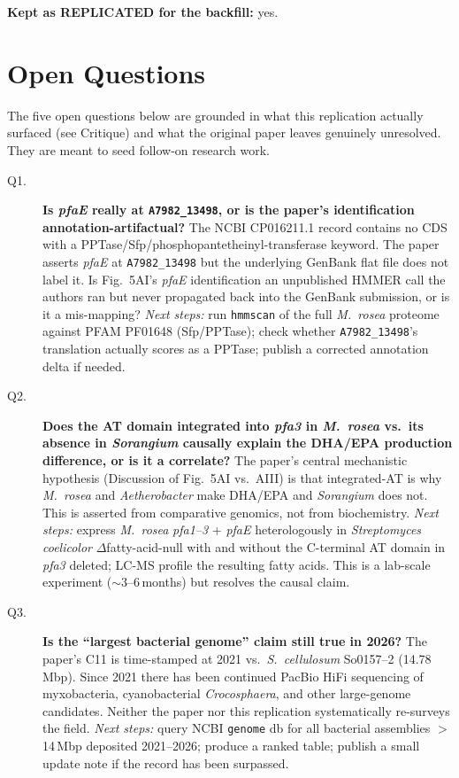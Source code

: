 \documentclass[11pt,letterpaper]{article}
\begin{document}
\textbf{Kept as REPLICATED for the backfill:} yes.

\section{Open Questions}\label{sec:oq}

The five open questions below are grounded in what this replication actually surfaced (see Critique) and what the original paper leaves genuinely unresolved. They are meant to seed follow-on research work.

\begin{description}
\item[Q1.] \textbf{Is \emph{pfaE} really at \texttt{A7982\_13498}, or is the paper's identification annotation-artifactual?} The NCBI CP016211.1 record contains no CDS with a PPTase/Sfp/phosphopantetheinyl-transferase keyword. The paper asserts \emph{pfaE} at \texttt{A7982\_13498} but the underlying GenBank flat file does not label it. Is Fig.\ 5AI's \emph{pfaE} identification an unpublished HMMER call the authors ran but never propagated back into the GenBank submission, or is it a mis-mapping? \emph{Next steps:} run \texttt{hmmscan} of the full \emph{M.\ rosea} proteome against PFAM PF01648 (Sfp/PPTase); check whether \texttt{A7982\_13498}'s translation actually scores as a PPTase; publish a corrected annotation delta if needed.

\item[Q2.] \textbf{Does the AT domain integrated into \emph{pfa3} in \emph{M.\ rosea} vs.\ its absence in \emph{Sorangium} causally explain the DHA/EPA production difference, or is it a correlate?} The paper's central mechanistic hypothesis (Discussion of Fig.\ 5AI vs.\ AIII) is that integrated-AT is why \emph{M.\ rosea} and \emph{Aetherobacter} make DHA/EPA and \emph{Sorangium} does not. This is asserted from comparative genomics, not from biochemistry. \emph{Next steps:} express \emph{M.\ rosea} \emph{pfa1--3} + \emph{pfaE} heterologously in \emph{Streptomyces coelicolor} $\Delta$fatty-acid-null with and without the C-terminal AT domain in \emph{pfa3} deleted; LC-MS profile the resulting fatty acids. This is a lab-scale experiment ($\sim$3--6\,months) but resolves the causal claim.

\item[Q3.] \textbf{Is the ``largest bacterial genome'' claim still true in 2026?} The paper's C11 is time-stamped at 2021 vs.\ \emph{S.\ cellulosum} So0157--2 (14.78\,Mbp). Since 2021 there has been continued PacBio HiFi sequencing of myxobacteria, cyanobacterial \emph{Crocosphaera}, and other large-genome candidates. Neither the paper nor this replication systematically re-surveys the field. \emph{Next steps:} query NCBI \texttt{genome} db for all bacterial assemblies $>$14\,Mbp deposited 2021--2026; produce a ranked table; publish a small update note if the record has been surpassed.


\end{description}
\end{document}
